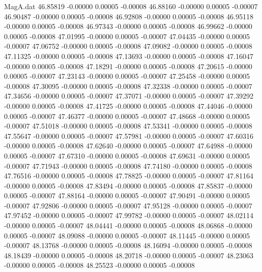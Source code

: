 \begin{filecontents}{MagA.dat}
  46.85819   -0.00000    0.00005   -0.00008
  46.88160   -0.00000    0.00005   -0.00007
  46.90487   -0.00000    0.00005   -0.00008
  46.92808   -0.00000    0.00005   -0.00008
  46.95118   -0.00000    0.00005   -0.00008
  46.97343   -0.00000    0.00005   -0.00008
  46.99662   -0.00000    0.00005   -0.00008
  47.01995   -0.00000    0.00005   -0.00007
  47.04435   -0.00000    0.00005   -0.00007
  47.06752   -0.00000    0.00005   -0.00008
  47.09082   -0.00000    0.00005   -0.00008
  47.11325   -0.00000    0.00005   -0.00008
  47.13693   -0.00000    0.00005   -0.00008
  47.16047   -0.00000    0.00005   -0.00008
  47.18291   -0.00000    0.00005   -0.00008
  47.20615   -0.00000    0.00005   -0.00007
  47.23143   -0.00000    0.00005   -0.00007
  47.25458   -0.00000    0.00005   -0.00008
  47.30095   -0.00000    0.00005   -0.00008
  47.32338   -0.00000    0.00005   -0.00007
  47.34656   -0.00000    0.00005   -0.00007
  47.37071   -0.00000    0.00005   -0.00007
  47.39292   -0.00000    0.00005   -0.00008
  47.41725   -0.00000    0.00005   -0.00008
  47.44046   -0.00000    0.00005   -0.00007
  47.46377   -0.00000    0.00005   -0.00007
  47.48668   -0.00000    0.00005   -0.00007
  47.51018   -0.00000    0.00005   -0.00008
  47.53341   -0.00000    0.00005   -0.00008
  47.55647   -0.00000    0.00005   -0.00007
  47.57981   -0.00000    0.00005   -0.00007
  47.60316   -0.00000    0.00005   -0.00008
  47.62640   -0.00000    0.00005   -0.00007
  47.64988   -0.00000    0.00005   -0.00007
  47.67310   -0.00000    0.00005   -0.00008
  47.69631   -0.00000    0.00005   -0.00007
  47.71943   -0.00000    0.00005   -0.00008
  47.74180   -0.00000    0.00005   -0.00008
  47.76516   -0.00000    0.00005   -0.00008
  47.78825   -0.00000    0.00005   -0.00007
  47.81164   -0.00000    0.00005   -0.00008
  47.83494   -0.00000    0.00005   -0.00008
  47.85837   -0.00000    0.00005   -0.00007
  47.88164   -0.00000    0.00005   -0.00007
  47.90491   -0.00000    0.00005   -0.00007
  47.92806   -0.00000    0.00005   -0.00007
  47.95128   -0.00000    0.00005   -0.00007
  47.97452   -0.00000    0.00005   -0.00007
  47.99782   -0.00000    0.00005   -0.00007
  48.02114   -0.00000    0.00005   -0.00007
  48.04441   -0.00000    0.00005   -0.00008
  48.06868   -0.00000    0.00005   -0.00007
  48.09088   -0.00000    0.00005   -0.00007
  48.11445   -0.00000    0.00005   -0.00007
  48.13768   -0.00000    0.00005   -0.00008
  48.16094   -0.00000    0.00005   -0.00008
  48.18439   -0.00000    0.00005   -0.00008
  48.20718   -0.00000    0.00005   -0.00007
  48.23063   -0.00000    0.00005   -0.00008
  48.25523   -0.00000    0.00005   -0.00008

\end{filecontents}
